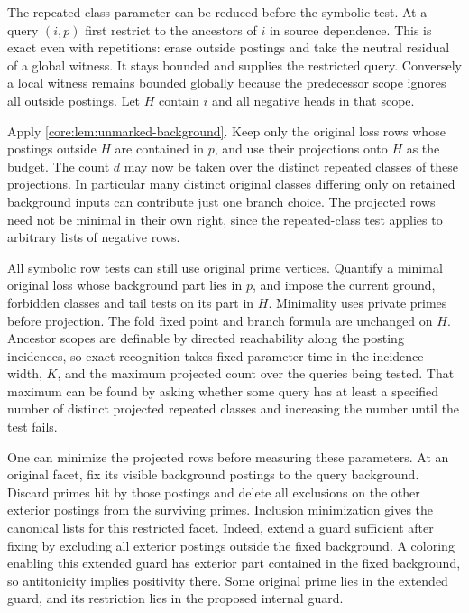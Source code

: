 The repeated-class parameter can be reduced before
the symbolic test. At a query $(i,p)$ first restrict
to the ancestors of $i$ in source dependence. This
is exact even with repetitions: erase outside
postings and take the neutral residual of a global
witness. It stays bounded and supplies the restricted
query. Conversely a local witness remains bounded
globally because the predecessor scope ignores all
outside postings. Let $H$ contain $i$ and all
negative heads in that scope.

Apply \cref{core:lem:unmarked-background}. Keep
only the original loss rows whose postings outside
$H$ are contained in $p$, and use their projections
onto $H$ as the budget. The count $d$ may now be
taken over the distinct repeated classes of these
projections. In particular many distinct original
classes differing only on retained background
inputs can contribute just one branch choice.
The projected rows need not be minimal in their
own right, since the repeated-class test applies
to arbitrary lists of negative rows.

All symbolic row tests can still use original prime
vertices. Quantify a minimal original loss whose
background part lies in $p$, and impose the
current ground, forbidden classes and tail tests
on its part in $H$. Minimality uses private primes
before projection. The fold fixed point and branch
formula are unchanged on $H$. Ancestor scopes are
definable by directed reachability along the posting
incidences, so exact recognition takes fixed-parameter
time in the incidence width, $K$, and the maximum
projected count over the queries being tested.
That maximum can be found by asking whether some
query has at least a specified number of distinct
projected repeated classes and increasing the
number until the test fails.

One can minimize the projected rows before measuring
these parameters. At an original facet, fix its
visible background postings to the query background.
Discard primes hit by those postings and delete all
exclusions on the other exterior postings from
the surviving primes. Inclusion minimization gives
the canonical lists for this restricted facet.
Indeed, extend a guard sufficient after fixing by
excluding all exterior postings outside the fixed
background. A coloring enabling this extended guard
has exterior part contained in the fixed background,
so antitonicity implies positivity there. Some original
prime lies in the extended guard, and its restriction
lies in the proposed internal guard.

